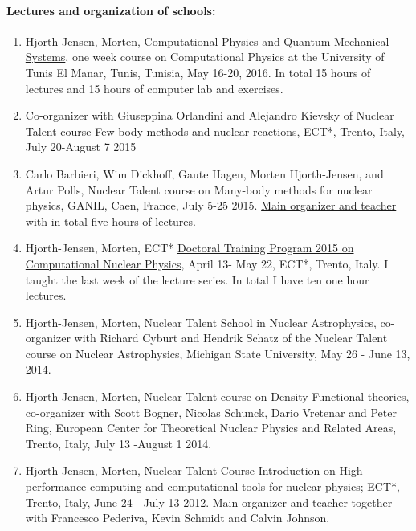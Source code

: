 \documentclass[%
oneside,                 %
final,                   %
10pt]{article}
\begin{document}
\paragraph{Lectures and organization of schools:}
\begin{enumerate}
\item Hjorth-Jensen, Morten, \href{{http://compphysics.github.io/CompPhysUTunis/doc/web/course.html}}{Computational Physics and Quantum Mechanical Systems}, one week course on Computational Physics at the University of Tunis El Manar, Tunis, Tunisia, May 16-20, 2016. In total 15 hours of lectures and 15 hours of computer lab and exercises. 

\item Co-organizer with Giuseppina Orlandini and Alejandro Kievsky of Nuclear Talent course \href{{https://groups.nscl.msu.edu/jina/talent/wiki/Course_3}}{Few-body methods and nuclear reactions}, ECT*, Trento, Italy, July 20-August 7 2015

\item Carlo Barbieri, Wim Dickhoff, Gaute Hagen, Morten Hjorth-Jensen, and Artur Polls, Nuclear Talent course on Many-body methods for nuclear physics, GANIL, Caen, France, July 5-25 2015. \href{{http://nucleartalent.github.io/Course2ManyBodyMethods/doc/web/course.html}}{Main organizer and teacher with in total five hours of lectures}. 

\item Hjorth-Jensen, Morten, ECT* \href{{http://www.ectstar.eu/node/1287}}{Doctoral Training Program 2015 on Computational Nuclear Physics}, April 13- May 22, ECT*, Trento, Italy. I taught the last week of the lecture series. In total I have ten one hour lectures. 

\item Hjorth-Jensen, Morten, Nuclear Talent School in Nuclear Astrophysics, co-organizer with Richard Cyburt and Hendrik Schatz of the Nuclear Talent course on Nuclear Astrophysics,  Michigan State University, May 26 - June 13, 2014. 

\item Hjorth-Jensen, Morten, Nuclear Talent course on Density Functional theories, co-organizer with Scott Bogner, Nicolas Schunck, Dario Vretenar and Peter Ring, European Center for Theoretical Nuclear Physics and Related Areas, Trento, Italy, July 13 -August 1 2014.

\item Hjorth-Jensen, Morten, Nuclear Talent Course  Introduction on High-performance computing and computational tools for nuclear physics; ECT*, Trento, Italy, June 24 - July 13 2012. Main organizer and teacher together with Francesco Pederiva, Kevin Schmidt and Calvin Johnson. 


\end{enumerate}
\end{document}
